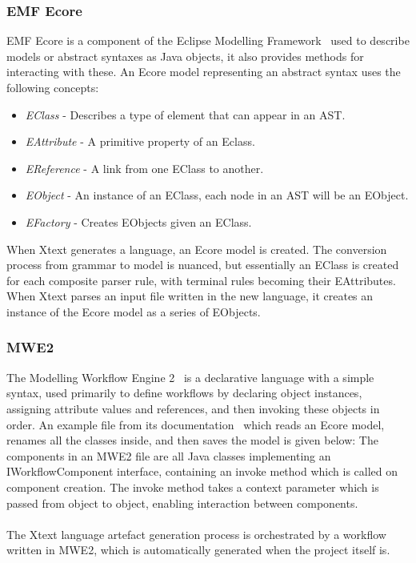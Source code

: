 \documentclass{article}
\begin{document}
\subsubsection{EMF Ecore}\label{emf}
EMF Ecore is a component of the Eclipse Modelling Framework~\cite{emf} used to describe models or abstract syntaxes as Java objects, it also provides methods for interacting with these. An Ecore model representing an abstract syntax uses the following concepts:
\begin{itemize}
\item \emph{EClass} - Describes a type of element that can appear in an AST.
\item \emph{EAttribute} - A primitive property of an Eclass.
\item \emph{EReference} - A link from one EClass to another.
\item \emph{EObject} - An instance of an EClass, each node in an AST will be an EObject.
\item \emph{EFactory} - Creates EObjects given an EClass.
\end{itemize}
When Xtext generates a language, an Ecore model is created. The conversion process from grammar to model is nuanced, but essentially an EClass is created for each composite parser rule, with terminal rules becoming their EAttributes. When Xtext parses an input file written in the new language, it creates an instance of the Ecore model as a series of EObjects.
\subsubsection{MWE2}
The Modelling Workflow Engine 2~\cite{mwe2} is a declarative language with a simple syntax, used primarily to define workflows by declaring object instances, assigning attribute values and references, and then invoking these objects in order. An example file from its documentation~\cite{mwe2} which reads an Ecore model, renames all the classes inside, and then saves the model is given below: 
The components in an MWE2 file are all Java classes implementing an IWorkflowComponent interface, containing an invoke method which is called on component creation. The invoke method takes a context parameter which is passed from object to object, enabling interaction between components.
\\
\\
The Xtext language artefact generation process is orchestrated by a workflow written in MWE2, which is automatically generated when the project itself is.
\end{document}
